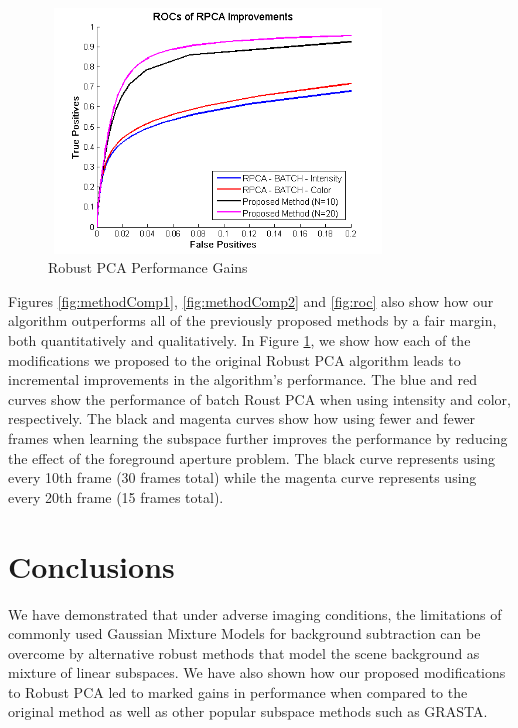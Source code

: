 \documentclass{article}
\begin{document}
\begin{figure}[t]
\begin{minipage}[b]{\linewidth}
  \centering
  \centerline{\includegraphics[width=9cm, height = 6.5cm]{Imgs/ROC_RPCA.png}}
\end{minipage}

\caption{Robust PCA Performance Gains}
\label{fig:roc2}
\end{figure}


Figures \ref{fig:methodComp1}, \ref{fig:methodComp2} and \ref{fig:roc} also show how our algorithm outperforms all of the previously proposed methods by a fair margin, both quantitatively and qualitatively. In Figure \ref{fig:roc2}, we show how each of the modifications we proposed to the original Robust PCA algorithm leads to incremental improvements in the algorithm's performance. The blue and red curves show the performance of batch Roust PCA when using intensity and color, respectively. The black and magenta curves show how using fewer and fewer frames when learning the subspace further improves the performance by reducing the effect of the foreground aperture problem. The black curve represents using every 10th frame (30 frames total) while the magenta curve represents using every 20th frame (15 frames total). 



\section{Conclusions}
We have demonstrated that under adverse imaging conditions, the limitations of commonly used Gaussian Mixture Models for background subtraction can be overcome by alternative robust methods that model the scene background as mixture of linear subspaces. We have also shown how our proposed modifications to Robust PCA led to marked gains in performance when compared to the original method as well as other popular subspace methods such as GRASTA.
\end{document}
